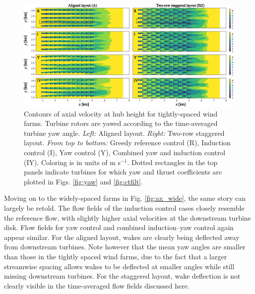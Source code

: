 \documentclass[a4paper]{jpconf}
\begin{document}
\begin{figure}[t]
	\includegraphics[width=\textwidth]{Torque18/tight_stat}
	\caption{Contours of axial velocity at hub height for tightly-spaced wind farms. Turbine rotors are yawed according to the time-averaged turbine yaw angle. \emph{Left: } Aligned layout. \emph{Right: } Two-row staggered layout. \emph{From top to bottom:} Greedy reference control (R), Induction control (I), Yaw control (Y), Combined yaw and induction control (IY). Coloring is in units of m s$^{-1}$. Dotted rectangles in the top panels indicate turbines for which yaw and thrust coefficients are plotted in Figs. \ref{fig:yaw} and \ref{fig:ctfilt}. \label{fig:ax_tight}}
\end{figure}

Moving on to the widely-spaced farms in Fig. \ref{fig:ax_wide}, the same story can largely be retold. The flow fields of the induction control cases closely resemble the reference flow, with slightly higher axial velocities at the downstream turbine disk. Flow fields for yaw control and combined induction--yaw control again appear similar.  For the aligned layout, wakes are clearly being deflected away from downstream turbines. Note however that the mean yaw angles are smaller than those in the tightly spaced wind farms, due to the fact that a larger streamwise spacing allows wakes to be deflected at smaller angles while still missing downstream turbines. For the staggered layout, wake deflection is not clearly visible in the time-averaged flow fields discussed here. 
\end{document}
